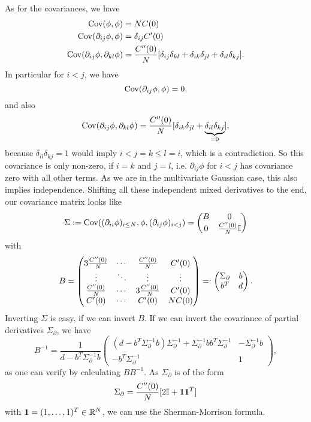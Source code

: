 As for the covariances, we have 
\begin{align*}
	\operatorname{Cov}(\phi,\phi) &= N C(0)\\
	\operatorname{Cov}(\partial_{ij}\phi,\phi) &= \delta_{ij} C'(0)\\
	\operatorname{Cov}(\partial_{ij}\phi, \partial_{kl}\phi) &= \frac{C''(0)}{N}
	[\delta_{ij}\delta_{kl} + \delta_{ik}\delta_{jl} + \delta_{il}\delta_{kj}].
\end{align*}
In particular for \(i<j\), we have
\[
	\operatorname{Cov}(\partial_{ij}\phi, \phi) = 0,
\]
and also
\[
	\operatorname{Cov}(\partial_{ij}\phi, \partial_{kl}\phi) = \frac{C''(0)}{N}
	[\delta_{ik}\delta_{jl} + \underbrace{\delta_{il}\delta_{kj}}_{=0}],
\]
because \(\delta_{il}\delta_{kj}=1\) would imply \(i < j = k \le l = i\), which
is a contradiction. So this covariance is only non-zero, if \(i=k\) and \(j=l\),
i.e. \(\partial_{ij}\phi\) for \(i<j\) has covariance zero with all other terms.
As we are in the multivariate Gaussian case, this also implies independence.
Shifting all these independent mixed derivatives to the end, our covariance
matrix looks like
\[
	\Sigma := \operatorname{Cov}((\partial_{ii}\phi)_{i\le N}, \phi, (\partial_{ij}\phi)_{i<j})
	= \begin{pmatrix}
		B & 0\\
		0 & \frac{C''(0)}{N}\mathbb{I}
	\end{pmatrix}
\]
with
\[
	B = \begin{pmatrix}
		3\frac{C''(0)}{N} &  \cdots & \frac{C''(0)}{N}
		& C'(0) \\
		\vdots & \ddots &\vdots & \vdots \\
		\frac{C''(0)}{N} & \cdots &  3 \frac{C''(0)}{N} & C'(0)\\
		C'(0)	& \cdots & C'(0) & N C(0)
	\end{pmatrix}
	=: \begin{pmatrix}
		\Sigma_\partial & b \\
		b^T & d
	\end{pmatrix}.
\]
Inverting \(\Sigma\) is easy, if we can invert \(B\). If we can invert the
covariance of partial derivatives \(\Sigma_\partial\), we have
\[
	B^{-1} = \frac1{d- b^T \Sigma_\partial^{-1}b}\begin{pmatrix}
		( d- b^T \Sigma_\partial^{-1}b )\Sigma_\partial^{-1}
		+ \Sigma_\partial^{-1}b b^T \Sigma_\partial^{-1}
		& -\Sigma_\partial^{-1} b\\
		-b^T\Sigma_\partial ^{-1} &  1
	\end{pmatrix},
\]
as one can verify by calculating \(BB^{-1}\). As \(\Sigma_\partial\) is of the form
\[
	\Sigma_\partial=\frac{C''(0)}{N}[2\mathbb{I} + \mathbf{1}\mathbf{1}^T]
\]
with \(\mathbf{1}=(1,\dots,1)^T\in\mathbb{R}^N\), we can use the Sherman-Morrison
formula.

